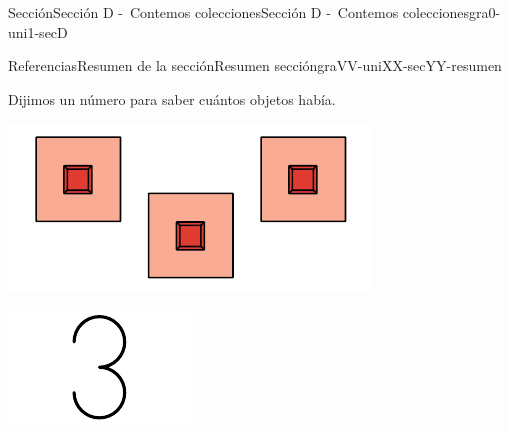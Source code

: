\documentclass[twoside,10pt,]{article}
\begin{document}
\begin{sectionptx}{Sección}{Sección D -~Contemos colecciones}{}{Sección D -~Contemos colecciones}{}{}{gra0-uni1-secD}
\begin{references-subsection}{Referencias}{Resumen de la sección}{}{Resumen sección}{}{}{graVV-uniXX-secYY-resumen}
\begin{sidebyside}{2}{0}{0}{0}
\begin{sbspanel}{0.6}
\end{sbspanel}%
\end{sidebyside}%
\par
Dijimos un número para saber cuántos objetos había.%
\begin{sidebyside}{2}{0}{0}{0}%
\begin{sbspanel}{0.5}%
\includegraphics[width=\linewidth]{external/svg-source/tikz-file-147785.pdf}
\end{sbspanel}%
\begin{sbspanel}{0.5}%
\includegraphics[width=\linewidth]{external/svg-source/tikz-file-147786.pdf}
\end{sbspanel}%
\end{sidebyside}%
\end{references-subsection}
\end{sectionptx}
%
%
\typeout{************************************************}
\typeout{************************************************}
%
\end{document}
